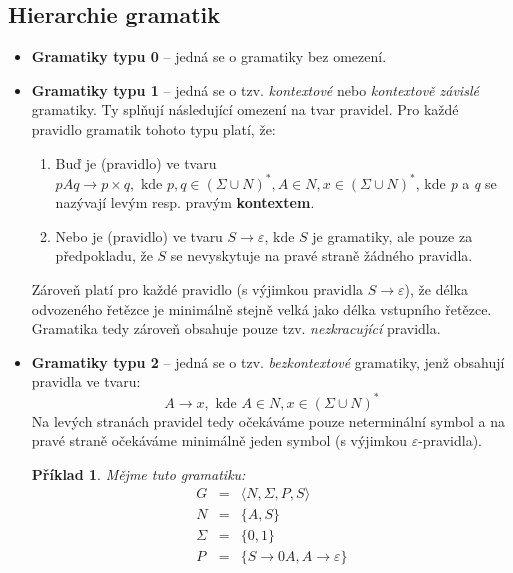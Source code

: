 \documentclass[10pt, a4paper, titlepage]{article}
\theoremstyle{note}
\newtheorem{priklad}{Příklad}
\begin{document}
\subsection{Hierarchie gramatik}
\begin{itemize}
\item
\textbf{Gramatiky typu 0} -- jedná se o gramatiky bez omezení.

\item
\textbf{Gramatiky typu 1\label{gram-1}} -- jedná se o tzv. \emph{kontextové} nebo \emph{kontextově závislé} gramatiky.
Ty splňují následující omezení na tvar pravidel. Pro každé pravidlo gramatik tohoto typu platí, že:
\begin{enumerate}
\item
Buď je (pravidlo) ve tvaru $pAq \rightarrow p \times q, \text{ kde } p, q \in (\Sigma \cup N)^{*}, A \in N, x \in (\Sigma \cup N)^{*}$, kde \emph{p} a \emph{q}
se nazývají levým resp. pravým \textbf{kontextem}.

\item
Nebo je (pravidlo) ve tvaru $S \rightarrow \varepsilon$, kde $S$ je  gramatiky, ale pouze
za předpokladu, že $S$ se nevyskytuje na pravé straně žádného pravidla.
\end{enumerate}

Zároveň platí pro každé pravidlo (s výjimkou pravidla $S \rightarrow \varepsilon$), že délka odvozeného řetězce je minimálně stejně velká jako délka vstupního řetězce. Gramatika tedy zároveň obsahuje pouze tzv. \emph{nezkracující} pravidla.

\item
\textbf{Gramatiky typu 2} -- jedná se o tzv. \emph{bezkontextové} gramatiky, jenž obsahují pravidla ve tvaru:
$$
A \rightarrow x, \text{ kde } A \in N, x \in (\Sigma \cup N)^{*}
$$
Na levých stranách pravidel tedy očekáváme pouze neterminální symbol a na pravé straně očekáváme minimálně jeden symbol (s výjimkou $\varepsilon$-pravidla).

\begin{priklad}
Mějme tuto gramatiku:
\begin{eqnarray*}
G &=& \langle N, \Sigma, P, S \rangle \\
N &=& \lbrace A, S \rbrace \\
\Sigma &=& \lbrace 0, 1 \rbrace \\
P &=& \lbrace S \rightarrow 0A, A \rightarrow \varepsilon \rbrace
\end{eqnarray*}
\end{priklad}


\end{itemize}
\end{document}
